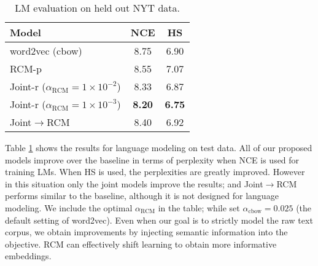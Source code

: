 \documentclass[11pt]{article}
\begin{document}
\begin{table}[t]
\centering
\small
	\begin{tabular}{|l|c|c|}
	\hline
	\bf Model & \bf NCE  & \bf HS\\
	\hline
	word2vec (cbow) & 8.75 & 6.90\\
	\hline
	RCM-p & 8.55 & 7.07 \\ 
	Joint-r ($\alpha_{\textrm{RCM}}=1\times10^{-2}$) & 8.33 & 6.87\\
	Joint-r ($\alpha_{\textrm{RCM}}=1\times10^{-3}$) & \bf  8.20 & \bf 6.75\\
	Joint$\rightarrow$RCM & 8.40 & 6.92\\
	\hline
	\end{tabular}
\caption{LM evaluation on held out NYT data.}
\label{tab:lm_results}
\end{table}

Table \ref{tab:lm_results} shows the results for language modeling on test data.  
All of our proposed models improve over the baseline in terms of perplexity when NCE is used for training LMs. 
When HS is used, the perplexities are greatly improved. However in this situation only the joint models improve the results; 
and Joint$\rightarrow$RCM performs similar to the baseline, although it is not designed for language modeling.
We include the optimal $\alpha_{\textrm{RCM}}$ in the table; while set $\alpha_{\textrm{cbow}} = 0.025$ (the default setting of word2vec).
Even when our goal is to strictly model the raw text corpus, we obtain improvements
by injecting semantic information into the objective. RCM can effectively shift learning
to obtain more informative embeddings.
\end{document}
